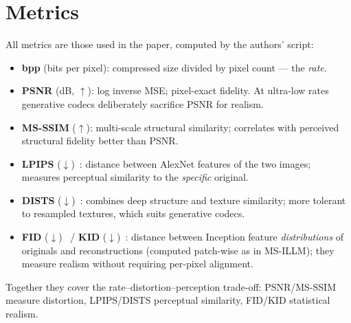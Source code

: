 \documentclass[conference]{IEEEtran}
\begin{document}
\section{Metrics}
All metrics are those used in the paper, computed by the authors' script:
\begin{itemize}
\item \textbf{bpp} (bits per pixel): compressed size divided by pixel count --- the \emph{rate}.
\item \textbf{PSNR} (dB, $\uparrow$): log inverse MSE; pixel-exact fidelity. At ultra-low rates
generative codecs deliberately sacrifice PSNR for realism.
\item \textbf{MS-SSIM} ($\uparrow$): multi-scale structural similarity; correlates with perceived
structural fidelity better than PSNR.
\item \textbf{LPIPS} ($\downarrow$)~\cite{lpips}: distance between AlexNet features of the two
images; measures perceptual similarity to the \emph{specific} original.
\item \textbf{DISTS} ($\downarrow$)~\cite{dists}: combines deep structure and texture similarity;
more tolerant to resampled textures, which suits generative codecs.
\item \textbf{FID} ($\downarrow$)~\cite{fid} / \textbf{KID} ($\downarrow$)~\cite{kid}: distance
between Inception feature \emph{distributions} of originals and reconstructions (computed
patch-wise as in MS-ILLM); they measure realism without requiring per-pixel alignment.
\end{itemize}
Together they cover the rate--distortion--perception trade-off: PSNR/MS-SSIM measure distortion,
LPIPS/DISTS perceptual similarity, FID/KID statistical realism.
\end{document}
